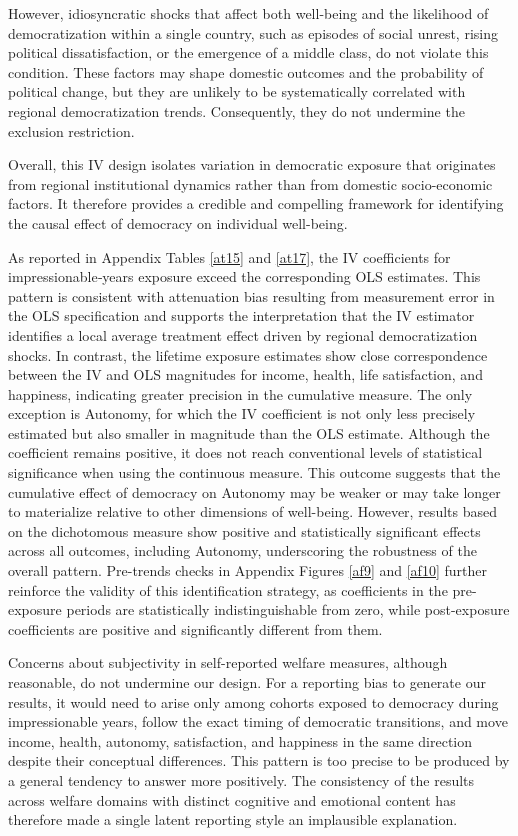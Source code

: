\documentclass[11pt]{article}
\begin{document}
However, idiosyncratic shocks that affect both well-being and the likelihood of democratization within a single country, such as episodes of social unrest, rising political dissatisfaction, or the emergence of a middle class, do not violate this condition. These factors may shape domestic outcomes and the probability of political change, but they are unlikely to be systematically correlated with regional democratization trends. Consequently, they do not undermine the exclusion restriction.

Overall, this IV design isolates variation in democratic exposure that originates from regional institutional dynamics rather than from domestic socio-economic factors. It therefore provides a credible and compelling framework for identifying the causal effect of democracy on individual well-being.

As reported in Appendix Tables \ref{at15} and \ref{at17}, the IV coefficients for impressionable‐years exposure exceed the corresponding OLS estimates. This pattern is consistent with attenuation bias resulting from measurement error in the OLS specification and supports the interpretation that the IV estimator identifies a local average treatment effect driven by regional democratization shocks. In contrast, the lifetime exposure estimates show close correspondence between the IV and OLS magnitudes for income, health, life satisfaction, and happiness, indicating greater precision in the cumulative measure. The only exception is Autonomy, for which the IV coefficient is not only less precisely estimated but also smaller in magnitude than the OLS estimate. Although the coefficient remains positive, it does not reach conventional levels of statistical significance when using the continuous measure. This outcome suggests that the cumulative effect of democracy on Autonomy may be weaker or may take longer to materialize relative to other dimensions of well-being. However, results based on the dichotomous measure show positive and statistically significant effects across all outcomes, including Autonomy, underscoring the robustness of the overall pattern. Pre-trends checks in Appendix Figures \ref{af9} and \ref{af10} further reinforce the validity of this identification strategy, as coefficients in the pre-exposure periods are statistically indistinguishable from zero, while post-exposure coefficients are positive and significantly different from them.

Concerns about subjectivity in self-reported welfare measures, although reasonable, do not undermine our design. For a reporting bias to generate our results, it would need to arise only among cohorts exposed to democracy during impressionable years, follow the exact timing of democratic transitions, and move income, health, autonomy, satisfaction, and happiness in the same direction despite their conceptual differences. This pattern is too precise to be produced by a general tendency to answer more positively. The consistency of the results across welfare domains with distinct cognitive and emotional content has therefore made a single latent reporting style an implausible explanation.
\end{document}
